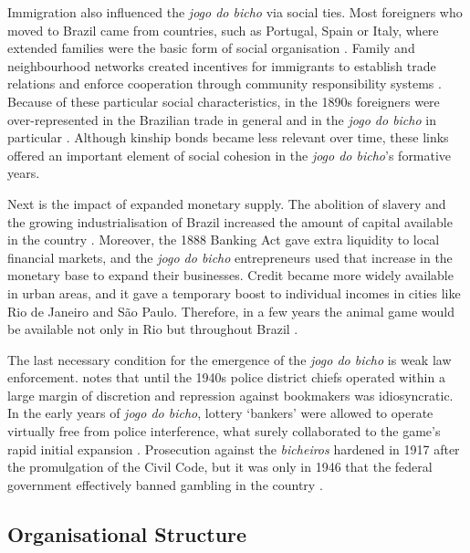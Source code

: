 \documentclass[a4paper,12pt]{article}
\begin{document}
Immigration also influenced the \emph{jogo do bicho} via social ties. Most foreigners who moved to Brazil came from countries, such as Portugal, Spain or Italy, where extended families were the basic form of social organisation \citep{lobo2001imigraccao, trento1989outro}. Family and neighbourhood networks created incentives for immigrants to establish trade relations and enforce cooperation through community responsibility systems \citep{roth2014prison}. Because of these particular social characteristics, in the 1890s foreigners were over-represented in the Brazilian trade in general \citep{mattos1991vadios, oliveira2001brasil} and in the \emph{jogo do bicho} in particular \citep{godoi2012imigraccao, magalhaes2005ganhou, villar2008contravencao}. Although kinship bonds became less relevant over time, these links offered an important element of social cohesion in the \emph{jogo do bicho}'s formative years.

Next is the impact of expanded monetary supply. The abolition of slavery and the growing industrialisation of Brazil increased the amount of capital available in the country \citep{franco1987reformas, schulz2008financial}. Moreover, the 1888 Banking Act gave extra liquidity to local financial markets, and the \emph{jogo do bicho} entrepreneurs used that increase in the monetary base to expand their businesses. Credit became more widely available in urban areas, and it gave a temporary boost to individual incomes in cities like Rio de Janeiro and São Paulo. Therefore, in a few years the animal game would be available not only in Rio but throughout Brazil \citep[76]{da1999aguias}.

The last necessary condition for the emergence of the \emph{jogo do bicho} is weak law enforcement. \citet[69--100]{chazkel2011laws} notes that until the 1940s police district chiefs operated within a large margin of discretion and repression against bookmakers was idiosyncratic. In the early years of \emph{jogo do bicho}, lottery `bankers' were allowed to operate virtually free from police interference, what surely collaborated to the game's rapid initial expansion \citep[544]{chazkel2007beyond}. Prosecution against the \emph{bicheiros} hardened in 1917 after the promulgation of the Civil Code, but it was only in 1946 that the federal government effectively banned gambling in the country \citep[155--156]{magalhaes2005ganhou}.


\subsection{Organisational Structure}
\label{sub:organisation}
\end{document}
